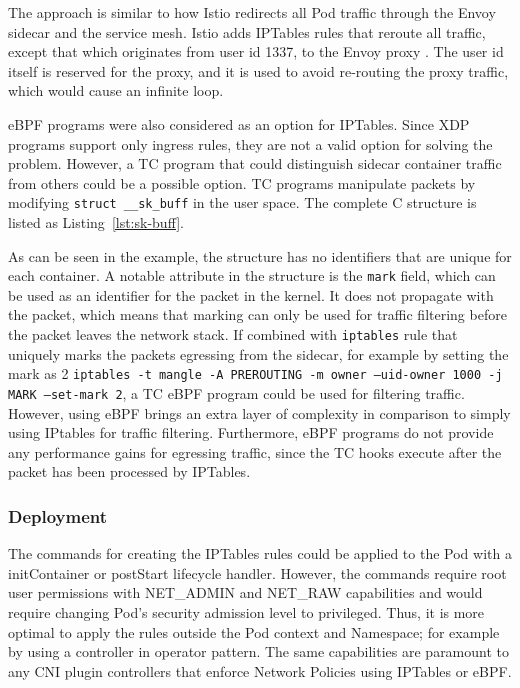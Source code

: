 \documentclass[english, 12pt, a4paper, sci, utf8, a-2b, online]{aaltothesis}
\begin{document}
The approach is similar to how Istio redirects all Pod traffic through the Envoy sidecar and the service mesh.
Istio adds IPTables rules that reroute all traffic, except that which originates from user id 1337, to the Envoy proxy \cite{istio-iptables}.
The user id itself is reserved for the proxy, and it is used to avoid re-routing the proxy traffic, which would cause an infinite loop.

eBPF programs were also considered as an option for IPTables.
Since XDP programs support only ingress rules, they are not a valid option for solving the problem.
However, a TC program that could distinguish sidecar container traffic from others could be a possible option.
TC programs manipulate packets by modifying \texttt{struct \_\_sk\_buff} in the user space.
The complete C structure is listed as Listing~\ref{lst:sk-buff}.



As can be seen in the example, the structure has no identifiers that are unique for each container.
A notable attribute in the structure is the \texttt{mark} field, which can be used as an identifier for the packet in the kernel.
It does not propagate with the packet, which means that marking can only be used for traffic filtering before the packet leaves the network stack.
If combined with \texttt{iptables} rule that uniquely marks the packets egressing from the sidecar, for example by setting the mark as 2 \texttt{iptables -t mangle -A PREROUTING -m owner --uid-owner 1000 -j MARK --set-mark 2}, a TC eBPF program could be used for filtering traffic.
However, using eBPF brings an extra layer of complexity in comparison to simply using IPtables for traffic filtering.
Furthermore, eBPF programs do not provide any performance gains for egressing traffic, since the TC hooks execute after the packet has been processed by IPTables.

\subsubsection{Deployment}

The commands for creating the IPTables rules could be applied to the Pod with a initContainer or postStart lifecycle handler.
However, the commands require root user permissions with NET\_ADMIN and NET\_RAW capabilities and would require changing Pod's security admission level to privileged.
Thus, it is more optimal to apply the rules outside the Pod context and Namespace; for example by using a controller in operator pattern.
The same capabilities are paramount to any CNI plugin controllers that enforce Network Policies using IPTables or eBPF.
\end{document}
